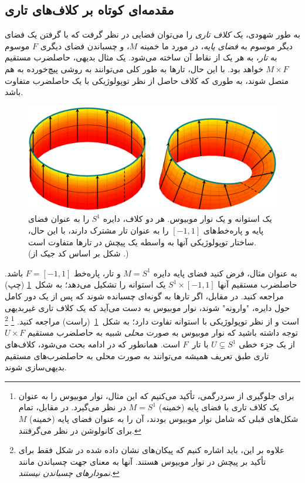

\subsection{مقدمه‌ای کوتاه بر کلاف‌های تاری}
\label{sec:fiber_bundles_general}


به طور شهودی، یک \emph{کلاف تاری} را می‌توان فضایی در نظر گرفت که با گرفتن یک فضای دیگر موسوم به \emph{فضای پایه}، در مورد ما خمینه $M$، و چسباندن فضای دیگری $F$ موسوم به \emph{تار}، به هر یک از نقاط آن ساخته می‌شود.
یک مثال بدیهی، حاصلضرب مستقیم \mbox{$M\times F$} خواهد بود.
با این حال، تارها به طور کلی می‌توانند به روشی پیچ‌خورده به هم متصل شوند، به طوری که کلاف حاصل از نظر توپولوژیکی با یک حاصلضرب متفاوت باشد.
\begin{figure}
	\vspace*{-1.4ex}
	\hfill
	\includegraphics[width=.98\linewidth]{figures/moebius.png}%
	\vspace*{.2ex}
	\caption{\small
		یک استوانه و یک نوار موبیوس.
		هر دو کلاف، دایره $S^1$ را به عنوان فضای پایه و پاره‌خط‌های $[-1,1]$ را به عنوان تار مشترک دارند، با این حال، ساختار توپولوژیکی آنها به واسطه یک پیچش در تارها متفاوت است.
		{\\
			\color{gray}
			\scriptsize
			(شکل بر اساس کد جیک از
			\href{https://tex.stackexchange.com/questions/118563/moebius-strip-using-tikz}{}.)
		}
	}
	\label{fig:moebius}
\end{figure}%
به عنوان مثال، فرض کنید فضای پایه دایره $M=S^1$ و تار، پاره‌خط $F=[-1,1]$ باشد.
حاصلضرب مستقیم آنها $S^1\times[-1,1]$ یک استوانه را تشکیل می‌دهد؛ به شکل~\ref{fig:moebius} (چپ) مراجعه کنید.
در مقابل، اگر تارها به گونه‌ای چسبانده شوند که پس از یک دور کامل حول دایره، "وارونه" شوند، نوار موبیوس به دست می‌آید که یک کلاف تاری غیربدیهی است و از نظر توپولوژیکی با استوانه تفاوت دارد؛ به شکل~\ref{fig:moebius}~(راست) مراجعه کنید.%
\footnote{
	برای جلوگیری از سردرگمی، تأکید می‌کنیم که این مثال، نوار موبیوس را به عنوان یک کلاف تاری با فضای پایه (خمینه) $M=S^1$ در نظر می‌گیرد.
	در مقابل، تمام شکل‌های قبلی که شامل نوار موبیوس بودند، آن را به عنوان فضای پایه (خمینه) $M$ برای کانولوشن در نظر می‌گرفتند.
}%
\footnote{
	علاوه بر این، باید اشاره کنیم که پیکان‌های نشان داده شده در شکل فقط برای تأکید بر پیچش در نوار موبیوس هستند.
	آنها به معنای جهت چسباندن مانند \emph{نمودارهای چسباندن} \emph{نیستند}.
}
توجه داشته باشید که نوار موبیوس به صورت \emph{محلی} شبیه به حاصلضرب مستقیم $U\times F$ از یک جزء خطی $U\subsetneq S^1$ با تار~$F$ است.
همانطور که در ادامه بحث می‌شود، کلاف‌های تاری طبق تعریف همیشه می‌توانند به صورت محلی به حاصلضرب‌های مستقیم بدیهی‌سازی شوند.


